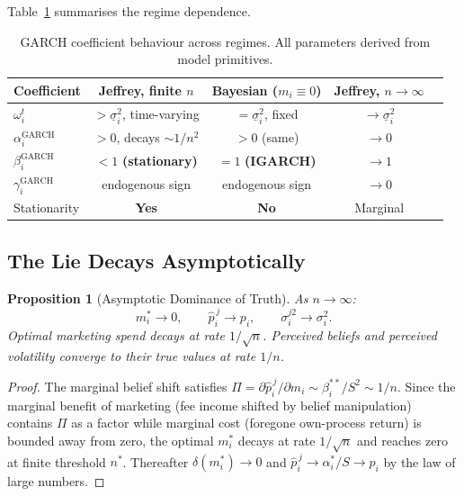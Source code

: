 \documentclass[12pt,a4paper]{article}
\newtheorem{proposition}{Proposition}
\newcommand{\hatpij}{\hat{p}_i^{\,j}}
\newcommand{\1}{\mathbf{1}}
\begin{document}
Table~\ref{tab:garch} summarises the regime dependence.

\begin{table}[h]
\centering
\caption{GARCH coefficient behaviour across regimes. All
parameters derived from model primitives.}
\label{tab:garch}
\begin{tabular}{@{}lcccc@{}}
\toprule
Coefficient
  & Jeffrey, finite $n$
  & Bayesian ($m_i \equiv 0$)
  & Jeffrey, $n\to\infty$ \\
\midrule
$\omega_i^t$
  & $>\underline{\sigma}_i^2$, time-varying
  & $=\underline{\sigma}_i^2$, fixed
  & $\to\underline{\sigma}_i^2$ \\
$\alpha_i^{\mathrm{GARCH}}$
  & $>0$, decays $\sim 1/n^2$
  & $>0$ (same)
  & $\to 0$ \\
$\beta_i^{\mathrm{GARCH}}$
  & $<1$ \textbf{(stationary)}
  & $=1$ \textbf{(IGARCH)}
  & $\to 1$ \\
$\gamma_i^{\mathrm{GARCH}}$
  & endogenous sign
  & endogenous sign
  & $\to 0$ \\
Stationarity
  & \textbf{Yes}
  & \textbf{No}
  & Marginal \\
\bottomrule
\end{tabular}
\end{table}

\subsection{The Lie Decays Asymptotically}

\begin{proposition}[Asymptotic Dominance of Truth]
\label{prop:convergence}
As $n \to \infty$:
\begin{equation}
  m_i^* \to 0,
  \qquad
  \hatpij \to p_i,
  \qquad
  \sigma_i^{j2} \to \sigma_i^2.
  \label{eq:convergence}
\end{equation}
Optimal marketing spend decays at rate $1/\sqrt{n}$.
Perceived beliefs and perceived volatility converge to their
true values at rate $1/n$.
\end{proposition}

\begin{proof}
The marginal belief shift satisfies
$\Pi = \partial\hatpij/\partial m_i \sim \beta_i^{**}/S^2 \sim 1/n$.
Since the marginal benefit of marketing (fee income shifted by belief
manipulation) contains $\Pi$ as a factor while marginal cost
(foregone own-process return) is bounded away from zero, the optimal
$m_i^*$ decays at rate $1/\sqrt{n}$ and reaches zero at finite
threshold $n^*$. Thereafter $\delta(m_i^*) \to 0$ and
$\hatpij \to \alpha_i^*/S \to p_i$ by the law of large numbers.
\end{proof}
\end{document}

